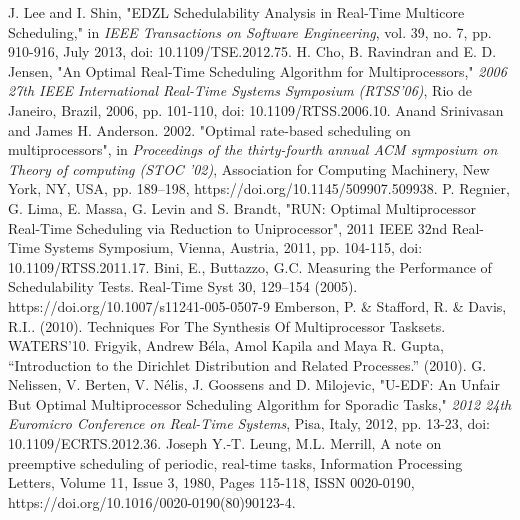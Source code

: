 \documentclass[conference,compsoc]{IEEEtran}
\begin{document}
\begin{thebibliography}{1}
J. Lee and I. Shin, "EDZL Schedulability Analysis in Real-Time Multicore Scheduling," in \emph{IEEE Transactions on Software Engineering}, vol. 39, no. 7, pp. 910-916, July 2013, doi: 10.1109/TSE.2012.75.
H. Cho, B. Ravindran and E. D. Jensen, "An Optimal Real-Time Scheduling Algorithm for Multiprocessors," \emph{2006 27th IEEE International Real-Time Systems Symposium (RTSS'06)}, Rio de Janeiro, Brazil, 2006, pp. 101-110, doi: 10.1109/RTSS.2006.10.
Anand Srinivasan and James H. Anderson. 2002. "Optimal rate-based scheduling on multiprocessors", in \emph{Proceedings of the thirty-fourth annual ACM symposium on Theory of computing (STOC '02)}, Association for Computing Machinery, New York, NY, USA, pp. 189–198, https://doi.org/10.1145/509907.509938.
P. Regnier, G. Lima, E. Massa, G. Levin and S. Brandt, "RUN: Optimal Multiprocessor Real-Time Scheduling via Reduction to Uniprocessor", 2011 IEEE 32nd Real-Time Systems Symposium, Vienna, Austria, 2011, pp. 104-115, doi: 10.1109/RTSS.2011.17.
Bini, E., Buttazzo, G.C. Measuring the Performance of Schedulability Tests. Real-Time Syst 30, 129–154 (2005). https://doi.org/10.1007/s11241-005-0507-9
Emberson, P. \& Stafford, R. \& Davis, R.I.. (2010). Techniques For The Synthesis Of Multiprocessor Tasksets. WATERS'10.
Frigyik, Andrew Béla, Amol Kapila and Maya R. Gupta, “Introduction to the Dirichlet Distribution and Related Processes.” (2010).
G. Nelissen, V. Berten, V. Nélis, J. Goossens and D. Milojevic, "U-EDF: An Unfair But Optimal Multiprocessor Scheduling Algorithm for Sporadic Tasks," \emph{2012 24th Euromicro Conference on Real-Time Systems}, Pisa, Italy, 2012, pp. 13-23, doi: 10.1109/ECRTS.2012.36.
Joseph Y.-T. Leung, M.L. Merrill, A note on preemptive scheduling of periodic, real-time tasks, Information Processing Letters, Volume 11, Issue 3, 1980, Pages 115-118, ISSN 0020-0190, https://doi.org/10.1016/0020-0190(80)90123-4.
\end{thebibliography}




\end{document}

